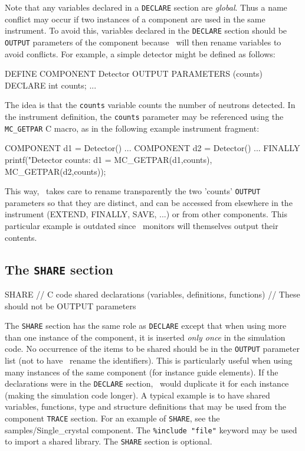 Note that any variables declared in a \verb+DECLARE+ section are
\emph{global}. Thus a name conflict may occur if two instances of a component
are used in the same instrument. To avoid this, variables declared in the
\texttt{DECLARE} section should be \texttt{OUTPUT} parameters of the component
because \MCS\ will then rename variables to avoid conflicts.  For example, a
simple detector might be defined as follows:

\begin{mcstas}
DEFINE COMPONENT Detector
OUTPUT PARAMETERS (counts)
DECLARE
  int counts;
...
\end{mcstas}

  The idea
is that the \texttt{counts} variable counts the number of neutrons detected. In
the instrument definition, the \texttt{counts} parameter may be referenced using
the \verb+MC_GETPAR+ C macro, as in the following example instrument
fragment:\label{mcgetpar}

\begin{mcstas}
COMPONENT d1 = Detector()
...
COMPONENT d2 = Detector()
...
FINALLY
  printf("Detector counts: d1 = %
         MC_GETPAR(d1,counts), MC_GETPAR(d2,counts));
\end{mcstas}

This way, \MCS\ takes care to rename transparently the two 'counts'
\texttt{OUTPUT} parameters so that they are distinct, and can be accessed from
elsewhere in the instrument (EXTEND, FINALLY, SAVE, ...)  or from other
components. This particular example is outdated since \MCS\ monitors will
themselves output their contents.

\subsection{The \texttt{SHARE} section}
\label{s:comp-share}
\begin{mcstas}
SHARE
// C code shared declarations (variables, definitions, functions)
// These should not be OUTPUT parameters
\end{mcstas}



The \texttt{SHARE} section has the same role as \texttt{DECLARE} except that
when using more than one instance of the component, it is inserted \emph{only
  once} in the simulation code. No occurrence of the items to be shared should be
in the \texttt{OUTPUT} parameter list (not to have \MCS\ rename the
identifiers).  This is particularly useful when using many instances of the same
component (for instance guide elements). If the declarations were in the
\texttt{DECLARE} section, \MCS\ would duplicate it for each instance (making the
simulation code longer).  A typical example is to have shared variables,
functions, type and structure definitions that may be used from the component
\texttt{TRACE} section. For an example of \texttt{SHARE}, see the
samples/Single\_crystal component. The \verb+%include "file"+ keyword may be
used to import
a shared library. The \texttt{SHARE} section is optional.

